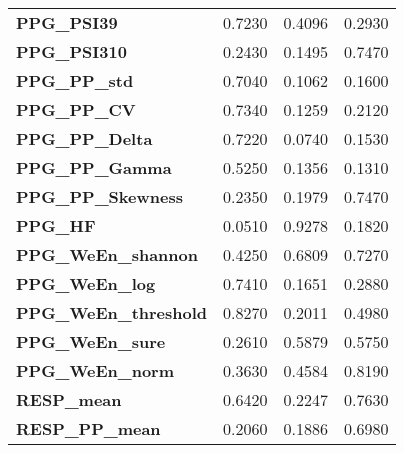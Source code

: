 \begin{footnotesize}
\begin{longtable}[htbp]{m{4.5cm}<{\raggedright}m{3cm}<{\raggedright}m{3cm}<{\raggedright}m{2.2cm}<{\raggedright}}
    { \textbf{PPG\_PSI39}}             & { 0.7230}                     & { 0.4096}                     & { 0.2930}                     \\
    { \textbf{PPG\_PSI310}}            & { 0.2430}                     & { 0.1495}                     & { 0.7470}                     \\
    { \textbf{PPG\_PP\_std}}           & { 0.7040}                     & { 0.1062}                     & { 0.1600}                     \\
    { \textbf{PPG\_PP\_CV}}            & { 0.7340}                     & { 0.1259}                     & { 0.2120}                     \\
    { \textbf{PPG\_PP\_Delta}}         & { 0.7220}                     & { 0.0740}                     & { 0.1530}                     \\
    { \textbf{PPG\_PP\_Gamma}}         & { 0.5250}                     & { 0.1356}                     & { 0.1310}                     \\
    { \textbf{PPG\_PP\_Skewness}}      & { 0.2350}                     & { 0.1979}                     & { 0.7470}                     \\
    { \textbf{PPG\_HF}}                & { 0.0510}                     & { 0.9278}                     & { 0.1820}                     \\
    { \textbf{PPG\_WeEn\_shannon}}     & { 0.4250}                     & { 0.6809}                     & { 0.7270}                     \\
    { \textbf{PPG\_WeEn\_log}}         & { 0.7410}                     & { 0.1651}                     & { 0.2880}                     \\
    { \textbf{PPG\_WeEn\_threshold}}   & { 0.8270}                     & { 0.2011}                     & { 0.4980}                     \\
    { \textbf{PPG\_WeEn\_sure}}        & { 0.2610}                     & { 0.5879}                     & { 0.5750}                     \\
    { \textbf{PPG\_WeEn\_norm}}        & { 0.3630}                     & { 0.4584}                     & { 0.8190}                     \\
    { \textbf{RESP\_mean}}             & { 0.6420}                     & { 0.2247}                     & { 0.7630}                     \\
    { \textbf{RESP\_PP\_mean}}         & { 0.2060}                     & { 0.1886}                     & { 0.6980}                     \\

\end{longtable}
\end{footnotesize}
